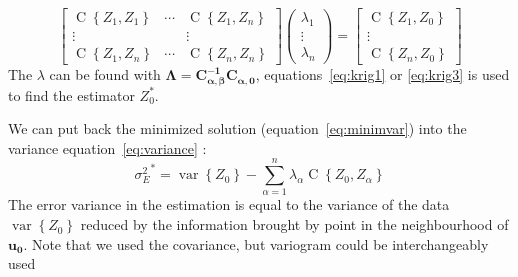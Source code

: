 \documentclass[twocolumn]{article}
\numberwithin{equation}{section}
\begin{document}
\[
		\begin{bmatrix}
       		\operatorname{C}\left\{Z_1,Z_1\right\} 	& \cdots & \operatorname{C}\left\{Z_1,Z_n\right\}   \\
       		\vdots 												& & \vdots 												\\
       		\operatorname{C}\left\{Z_1,Z_n\right\}  & \cdots & \operatorname{C}\left\{Z_n,Z_n\right\}
     	\end{bmatrix}
     	\begin{pmatrix}
       		\lambda_1 	\\
       		\vdots 		\\
       		\lambda_n  
     	\end{pmatrix}
     	=
     	\begin{bmatrix}
       		\operatorname{C}\left\{Z_1,Z_0\right\} \\
       		\vdots 												\\
       		\operatorname{C}\left\{Z_n,Z_0\right\} 
     	\end{bmatrix}
\]   
The $\lambda$ can be found with $\boldsymbol{\Lambda} = \boldsymbol{C_{\alpha,\beta}^{-1}} \boldsymbol{C_{\alpha,0}} $, equations~\ref{eq:krig1} or \ref{eq:krig3} is used to find the estimator $Z_0^*$.

We can put back the minimized solution (equation~\ref{eq:minimvar}) into the variance equation~\ref{eq:variance} :
\begin{equation}
	{\sigma^2_E}^*  = \operatorname{var}\left\{Z_0\right\} - \sum_{\alpha=1}^n \lambda_\alpha \operatorname{C}\left\{Z_0, Z_\alpha\right\}
\end{equation}
The error variance in the estimation is equal to the variance of the data $\operatorname{var}\left\{Z_0\right\}$ reduced by the information brought by  point in the neighbourhood of $\boldsymbol{u_0}$. Note that we used the covariance, but variogram could be interchangeably used 
\end{document}
